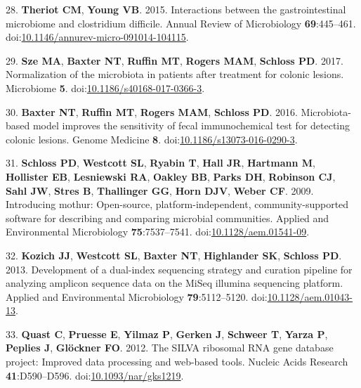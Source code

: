 \documentclass[11pt,]{article}
\begin{document}
\hypertarget{ref-Theriot2015}{}
28. \textbf{Theriot CM}, \textbf{Young VB}. 2015. Interactions between
the gastrointestinal microbiome and clostridium difficile. Annual Review
of Microbiology \textbf{69}:445--461.
doi:\href{https://doi.org/10.1146/annurev-micro-091014-104115}{10.1146/annurev-micro-091014-104115}.

\hypertarget{ref-normalization_sze2017}{}
29. \textbf{Sze MA}, \textbf{Baxter NT}, \textbf{Ruffin MT},
\textbf{Rogers MAM}, \textbf{Schloss PD}. 2017. Normalization of the
microbiota in patients after treatment for colonic lesions. Microbiome
\textbf{5}.
doi:\href{https://doi.org/10.1186/s40168-017-0366-3}{10.1186/s40168-017-0366-3}.

\hypertarget{ref-crc_model_baxter2016}{}
30. \textbf{Baxter NT}, \textbf{Ruffin MT}, \textbf{Rogers MAM},
\textbf{Schloss PD}. 2016. Microbiota-based model improves the
sensitivity of fecal immunochemical test for detecting colonic lesions.
Genome Medicine \textbf{8}.
doi:\href{https://doi.org/10.1186/s13073-016-0290-3}{10.1186/s13073-016-0290-3}.

\hypertarget{ref-Schloss2009}{}
31. \textbf{Schloss PD}, \textbf{Westcott SL}, \textbf{Ryabin T},
\textbf{Hall JR}, \textbf{Hartmann M}, \textbf{Hollister EB},
\textbf{Lesniewski RA}, \textbf{Oakley BB}, \textbf{Parks DH},
\textbf{Robinson CJ}, \textbf{Sahl JW}, \textbf{Stres B},
\textbf{Thallinger GG}, \textbf{Horn DJV}, \textbf{Weber CF}. 2009.
Introducing mothur: Open-source, platform-independent,
community-supported software for describing and comparing microbial
communities. Applied and Environmental Microbiology
\textbf{75}:7537--7541.
doi:\href{https://doi.org/10.1128/aem.01541-09}{10.1128/aem.01541-09}.

\hypertarget{ref-Kozich2013}{}
32. \textbf{Kozich JJ}, \textbf{Westcott SL}, \textbf{Baxter NT},
\textbf{Highlander SK}, \textbf{Schloss PD}. 2013. Development of a
dual-index sequencing strategy and curation pipeline for analyzing
amplicon sequence data on the MiSeq illumina sequencing platform.
Applied and Environmental Microbiology \textbf{79}:5112--5120.
doi:\href{https://doi.org/10.1128/aem.01043-13}{10.1128/aem.01043-13}.

\hypertarget{ref-Quast2012}{}
33. \textbf{Quast C}, \textbf{Pruesse E}, \textbf{Yilmaz P},
\textbf{Gerken J}, \textbf{Schweer T}, \textbf{Yarza P}, \textbf{Peplies
J}, \textbf{Glöckner FO}. 2012. The SILVA ribosomal RNA gene database
project: Improved data processing and web-based tools. Nucleic Acids
Research \textbf{41}:D590--D596.
doi:\href{https://doi.org/10.1093/nar/gks1219}{10.1093/nar/gks1219}.
\end{document}

